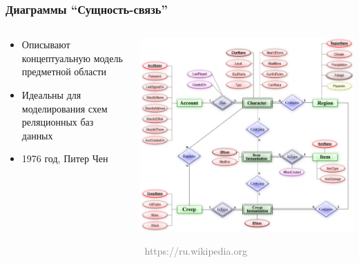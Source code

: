 \documentclass[xetex,mathserif,serif]{beamer}
\newcommand{\attribution}[1] {
    \vspace{-5mm}\begin{flushright}\begin{scriptsize}\textcolor{gray}{\textcopyright\, #1}\end{scriptsize}\end{flushright}
}
\begin{document}
    \begin{frame}
        \frametitle{Диаграммы ``Сущность-связь''}
        \begin{columns}
            \begin{column}{0.5\textwidth}
                \begin{itemize}
                    \item Описывают концептуальную модель предметной области
                    \item Идеальны для моделирования схем реляционных баз данных
                    \item 1976 год, Питер Чен
                \end{itemize}
            \end{column}
            \begin{column}{0.5\textwidth}
                \begin{center}
                    \includegraphics[width=\textwidth]{erChenNotation.png}
                    \attribution{https://ru.wikipedia.org}
                \end{center}
            \end{column}
        \end{columns}
    \end{frame}
\end{document}
